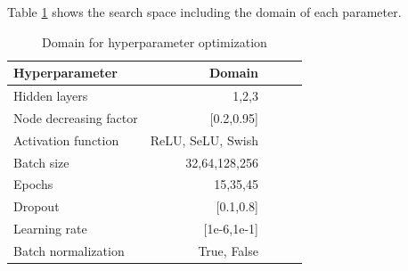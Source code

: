 \documentclass[bsc,frontabs,twoside,singlespacing,parskip,deptreport]{infthesis}     %
\begin{document}
Table \ref{search_sapce} shows the search space including the domain of each parameter.

\begin{table}[h!]
\centering
\begin{tabular}{lrrrr}
\toprule
{Hyperparameter} &  Domain  \\
\midrule
Hidden layers & {1,2,3} \\
Node decreasing factor & [0.2,0.95] \\
Activation function & {ReLU, SeLU, Swish} \\
Batch size & {32,64,128,256} \\
Epochs & {15,35,45} \\
Dropout & [0.1,0.8] \\
Learning rate & [1e-6,1e-1]  \\
Batch normalization & {True, False} \\
\bottomrule
\end{tabular}
\caption{Domain for hyperparameter optimization}\label{search_sapce}
\end{table}
\end{document}
